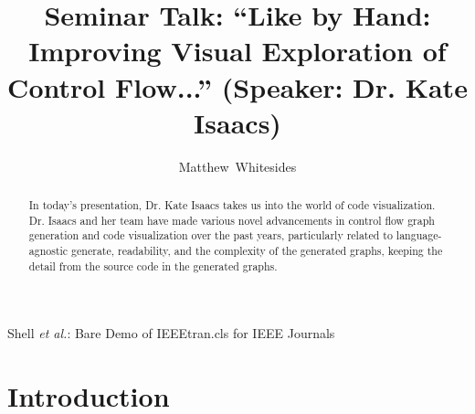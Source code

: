 \documentclass[journal,onecolumn]{IEEEtran}
\begin{document}
%
\title{Seminar Talk: ``Like by Hand: Improving Visual Exploration of Control Flow...'' (Speaker: Dr. Kate Isaacs)}

%
%
%
\author{Matthew~Whitesides}%

%
{Shell \MakeLowercase{\textit{et al.}}: Bare Demo of IEEEtran.cls for IEEE Journals}

\maketitle

\begin{abstract}
  In today's presentation, Dr. Kate Isaacs takes us into the world of code visualization. Dr. Isaacs and her team have made various novel advancements in control flow graph generation and code visualization over the past years, particularly related to language-agnostic generate, readability, and the complexity of the generated graphs, keeping the detail from the source code in the generated graphs. 
\end{abstract}


\IEEEpeerreviewmaketitle

\section{Introduction}
\end{document}

